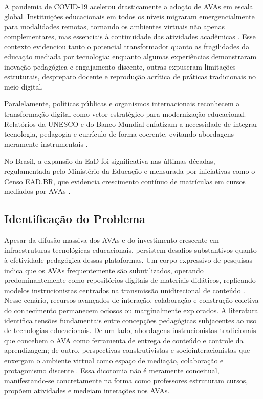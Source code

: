 \documentclass[portuguese]{sbc2025}%
\begin{document}
A pandemia de COVID-19 acelerou drasticamente a adoção de AVAs em escala global. Instituições educacionais em todos os níveis migraram emergencialmente para modalidades remotas, tornando os ambientes virtuais não apenas complementares, mas essenciais à continuidade das atividades acadêmicas \cite{Hodges2020, Williamson2020}. Esse contexto evidenciou tanto o potencial transformador quanto as fragilidades da educação mediada por tecnologia: enquanto algumas experiências demonstraram inovação pedagógica e engajamento discente, outras expuseram limitações estruturais, despreparo docente e reprodução acrítica de práticas tradicionais no meio digital.

Paralelamente, políticas públicas e organismos internacionais reconhecem a transformação digital como vetor estratégico para modernização educacional. Relatórios da UNESCO e do Banco Mundial enfatizam a necessidade de integrar tecnologia, pedagogia e currículo de forma coerente, evitando abordagens meramente instrumentais \cite{UNESCO2022, WorldBank2022}.

No Brasil, a expansão da EaD foi significativa nas últimas décadas, regulamentada pelo Ministério da Educação e mensurada por iniciativas como o Censo EAD.BR, que evidencia crescimento contínuo de matrículas em cursos mediados por AVAs \cite{ABED2023, MEC2017}.

\subsection{Identificação do Problema}

Apesar da difusão massiva dos AVAs e do investimento crescente em infraestruturas tecnológicas educacionais, persistem desafios substantivos quanto à efetividade pedagógica dessas plataformas. Um corpo expressivo de pesquisas indica que os AVAs frequentemente são subutilizados, operando predominantemente como repositórios digitais de materiais didáticos, replicando modelos instrucionistas centrados na transmissão unidirecional de conteúdo \cite{Martins2016, Bates2015}. Nesse cenário, recursos avançados de interação, colaboração e construção coletiva do conhecimento permanecem ociosos ou marginalmente explorados. A literatura identifica tensões fundamentais entre concepções pedagógicas subjacentes ao uso de tecnologias educacionais. De um lado, abordagens instrucionistas tradicionais que concebem o AVA como ferramenta de entrega de conteúdo e controle da aprendizagem; de outro, perspectivas construtivistas e sociointeracionistas que enxergam o ambiente virtual como espaço de mediação, colaboração e protagonismo discente \cite{Jonassen1999, Harasim2012}. Essa dicotomia não é meramente conceitual, manifestando-se concretamente na forma como professores estruturam cursos, propõem atividades e medeiam interações nos AVAs.
\end{document}
